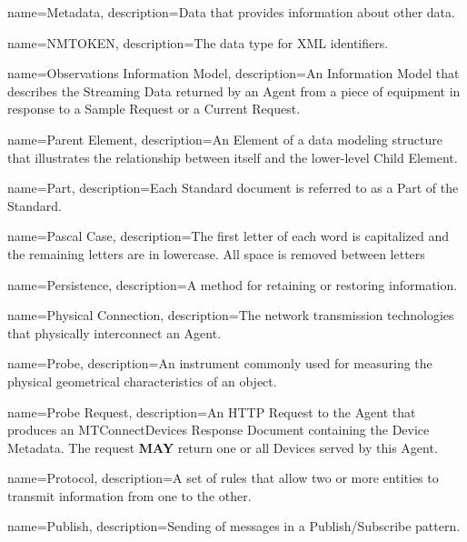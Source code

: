 {
    name={Metadata},
	description={Data that provides information about other data.
}
}

{
    name={NMTOKEN},
	description={The data type for XML identifiers.}
}

{
    name={Observations Information Model},
	description={An \gls{Information Model} that describes the \gls{Streaming Data} returned by an \gls{Agent} from a piece of equipment in response to a \gls{Sample Request} or a \gls{Current Request}.}
}

{
    name={Parent Element},
	description={An \gls{Element} of a data modeling structure that illustrates the relationship between itself and the lower-level \gls{Child Element}.}
}

{
    name={Part},
	description={Each Standard document is referred to as a \gls{Part} of the Standard.}
}

{
    name={Pascal Case},
	description={The first letter of each word is capitalized and the remaining letters are in lowercase. All space is removed between letters}
}

{
    name={Persistence},
	description={A method for retaining or restoring information.}
}

{
    name={Physical Connection},
	description={The network transmission technologies that physically interconnect an \gls{Agent}.}
}

{
    name={Probe},
	description={An instrument commonly used for measuring the physical geometrical characteristics of an object.}
}

{
    name={Probe Request},
	description={An \gls{HTTP Request} to the \gls{Agent} that produces an \gls{MTConnectDevices Response Document} containing the \gls{Device} \gls{Metadata}. The request \textbf{MAY} return one or all \glspl{Device} served by this \gls{Agent}.}
}

{
    name={Protocol},
	description={A set of rules that allow two or more entities to transmit information from one to the other.}
}

{
    name={Publish},
	description={Sending of messages in a \gls{Publish/Subscribe} pattern.}
}

